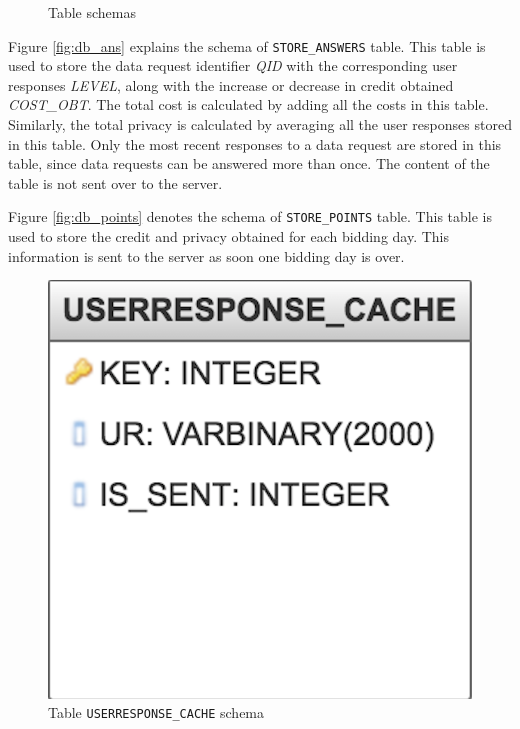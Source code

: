\begin{figure}[htp]
 \hspace{1em}
\caption{Table schemas}
\label{fig:ts11}
\end{figure}

Figure \ref{fig:db_ans} explains the schema of \texttt{STORE\_ANSWERS} table. This table is used to store the data request identifier \textit{QID} with the corresponding
user responses \textit{LEVEL}, along with the increase or decrease in credit obtained \textit{COST\_OBT}. The total cost is calculated by adding all the costs in this table. Similarly, the total privacy is calculated by averaging all the user responses stored in this table. Only the most recent responses to a data request are stored in this table, since data requests can be answered more than once. The content of the table is not sent over to the server.

Figure \ref{fig:db_points} denotes the schema of \texttt{STORE\_POINTS} table. This table is used to store the credit and privacy obtained for each bidding day.
This information is sent to the server as soon one bidding day is over.

\begin{figure}[ht!]
\centering
\includegraphics[width=0.4\linewidth]{./images/db_ur}
\caption{Table \texttt{USERRESPONSE\_CACHE} schema}
\label{fig:db_ur}
\end{figure}

